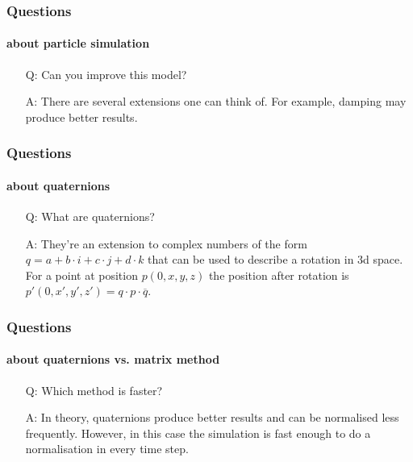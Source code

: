 \documentclass{beamer}
\begin{document}
 \begin{frame}
  \frametitle{Questions}
  \framesubtitle{about particle simulation}
  \begin{itemize}
   \item[Q:] Can you improve this model?
   \item[A:] There are several extensions one can think of. For example, damping may produce better results.
  \end{itemize}
 \end{frame}

 \begin{frame}
  \frametitle{Questions}
  \framesubtitle{about quaternions}
  \begin{itemize}
   \item[Q:] What are quaternions?
   \item[A:] They're an extension to complex numbers of the form $q = a + b \cdot i + c \cdot j + d \cdot k$ that can be used to describe a rotation in 3d space. For a point at position $p(0,x,y,z)$ the position after rotation is $p'(0,x',y',z') = q \cdot p \cdot \overline{q}$.
  \end{itemize}
 \end{frame}

 \begin{frame}
  \frametitle{Questions}
  \framesubtitle{about quaternions vs. matrix method}
  \begin{itemize}
   \item[Q:] Which method is faster?
   \item[A:] In theory, quaternions produce better results and can be normalised less frequently. However, in this case the simulation is fast enough to do a normalisation in every time step.
  \end{itemize}
 \end{frame}
\end{document}
